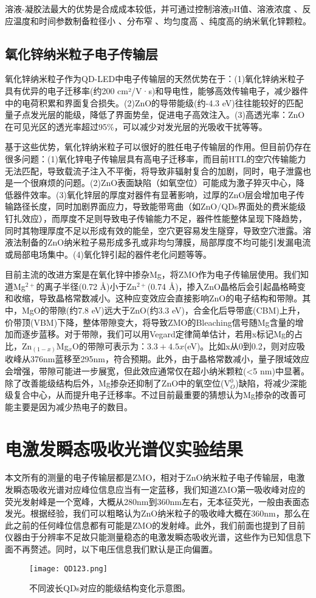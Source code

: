 溶液-凝胶法最大的优势是合成成本较低，并可通过控制溶液pH值、溶液浓度 、反应温度和时间参数制备粒径小 、分布窄 、均匀度高 、纯度高的纳米氧化锌颗粒\cite{GSYT200405013}。

\subsection{氧化锌纳米粒子电子传输层}
氧化锌纳米粒子作为QD-LED中电子传输层的天然优势在于：(1)氧化锌纳米粒子具有优异的电子迁移率(约200 cm²/V·s)和导电性，能够高效传输电子，减少器件中的电荷积累和界面复合损失。(2)ZnO的导带能级(约-4.3 eV)往往能较好的匹配量子点发光层的能级，降低了界面势垒，促进电子高效注入。(3)高透光率：ZnO在可见光区的透光率超过95\%，可以减少对发光层的光吸收干扰等等。

基于这些优势，氧化锌纳米粒子可以很好的胜任电子传输层的作用。但目前仍存在很多问题：(1)氧化锌电子传输层具有高电子迁移率，而目前HTL的空穴传输能力无法匹配，导致载流子注入不平衡，将导致非辐射复合的加剧，同时，电子泄露也是一个很麻烦的问题。(2)ZnO表面缺陷（如氧空位）可能成为激子猝灭中心，降低器件效率。(3)氧化锌层的厚度对器件有显著影响，过厚的ZnO层会增加电子传输路径长度，同时加剧界面应力，导致能带弯曲（如ZnO/QDs界面处的费米能级钉扎效应），而厚度不足则导致电子传输能力不足，器件性能整体呈现下降趋势，同时其物理厚度不足以形成有效的能垒，空穴更容易发生隧穿，导致空穴泄露。溶液法制备的ZnO纳米粒子易形成多孔或非均匀薄膜，局部厚度不均可能引发漏电流或局部电场集中。(4)氧化锌引起的器件老化问题等等。

目前主流的改进方案是在氧化锌中掺杂Mg，将ZMO作为电子传输层使用。我们知道Mg$^{2+}$的离子半径(0.72 Å)小于Zn$^{2+}$(0.74 Å)，掺入ZnO晶格后会引起晶格畸变和收缩，导致晶格常数减小。这种应变效应会直接影响ZnO的电子结构和带隙。其中，MgO的带隙(约7.8 eV)远大于ZnO(约3.3 eV)，合金化后导带底(CBM)上升，价带顶(VBM)下降，整体带隙变大，将导致ZMO的Bleaching信号随Mg含量的增加而逐步蓝移。对于带隙，我们可以用Vegard定律简单估计，若用x标记Mg的占比，Zn$_{(1-x)}$Mg$_x$O的带隙可表示为：$3.3+4.5x$(eV)。比如x从0到0.2，则对应吸收峰从376nm蓝移至295nm，符合预期。此外，由于晶格常数减小，量子限域效应会增强，带隙可能进一步展宽，但此效应通常仅在超小纳米颗粒(<5 nm)中显著。除了改善能级结构后外，Mg掺杂还抑制了ZnO中的氧空位(V$_O^0$)缺陷，将减少深能级复合中心，从而提升电子迁移率。不过目前最重要的猜想认为Mg掺杂的改善可能主要是因为减少热电子的数目。
\section{电激发瞬态吸收光谱仪实验结果}
本文所有的测量的电子传输层都是ZMO，相对于ZnO纳米粒子电子传输层，电激发瞬态吸收光谱对应峰位信息应当有一定蓝移，我们知道ZMO第一吸收峰对应的荧光发射峰是一个宽峰，大概从280nm到360nm左右，无本征荧光，一般由表面态发光。根据经验，我们可以粗略认为ZnO纳米粒子的吸收峰大概在360nm，那么在此之前的任何峰位信息都有可能是ZMO的发射峰。此外，我们前面也提到了目前仪器由于分辨率不足故只能测量稳态的电激发瞬态吸收光谱，这些作为已知信息下面不再赘述。同时，以下电压信息我们默认是正向偏置。
\begin{figure}[ht]
	\centering
	\texttt{[image: QD123.png]}
	\caption{不同波长QDs对应的能级结构变化示意图。}
	\label{fig:QD123}
\end{figure}


